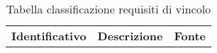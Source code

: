 \renewcommand{\arraystretch}{1.5}
\begin{longtable}{ c C{7.5cm} C{3cm} }
    \caption{Tabella classificazione requisiti di vincolo}\\
    \rowcolor{\primaryColor}
    \textcolor{\secondaryColor}{
    \textbf{Identificativo}} & \textcolor{\secondaryColor}{\textbf{Descrizione}}                                                            & \textcolor{\secondaryColor}
    {\textbf{Fonte}}                                                                                                                                                      \\



\end{longtable}
